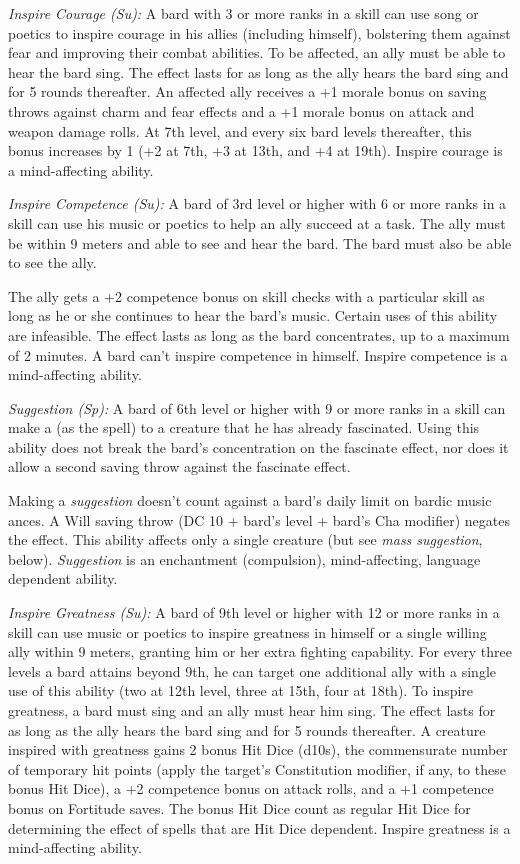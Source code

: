 \textit{Inspire Courage (Su):} A bard with 3 or more ranks in a  skill can use song or poetics to inspire courage in his allies (including himself), bolstering them against fear and improving their combat abilities. To be affected, an ally must be able to hear the bard sing. The effect lasts for as long as the ally hears the bard sing and for 5 rounds thereafter. An affected ally receives a +1 morale bonus on saving throws against charm and fear effects and a +1 morale bonus on attack and weapon damage rolls. At 7th level, and every six bard levels thereafter, this bonus increases by 1 (+2 at 7th, +3 at 13th, and +4 at 19th). Inspire courage is a mind-affecting ability.

\textit{Inspire Competence (Su):} A bard of 3rd level or higher with 6 or more ranks in a  skill can use his music or poetics to help an ally succeed at a task. The ally must be within 9 meters and able to see and hear the bard. The bard must also be able to see the ally.

The ally gets a +2 competence bonus on skill checks with a particular skill as long as he or she continues to hear the bard's music. Certain uses of this ability are infeasible. The effect lasts as long as the bard concentrates, up to a maximum of 2 minutes. A bard can't inspire competence in himself. Inspire competence is a mind-affecting ability.

\textit{Suggestion (Sp):} A bard of 6th level or higher with 9 or more ranks in a  skill can make a  (as the spell) to a creature that he has already fascinated. Using this ability does not break the bard's concentration on the fascinate effect, nor does it allow a second saving throw against the fascinate effect.

Making a \emph{suggestion} doesn't count against a bard's daily limit on bardic music ances. A Will saving throw (DC 10 + \onehalf bard's level + bard's Cha modifier) negates the effect. This ability affects only a single creature (but see \emph{mass suggestion}, below). \emph{Suggestion} is an enchantment (compulsion), mind-affecting, language dependent ability.

\textit{Inspire Greatness (Su):} A bard of 9th level or higher with 12 or more ranks in a  skill can use music or poetics to inspire greatness in himself or a single willing ally within 9 meters, granting him or her extra fighting capability. For every three levels a bard attains beyond 9th, he can target one additional ally with a single use of this ability (two at 12th level, three at 15th, four at 18th). To inspire greatness, a bard must sing and an ally must hear him sing. The effect lasts for as long as the ally hears the bard sing and for 5 rounds thereafter. A creature inspired with greatness gains 2 bonus Hit Dice (d10s), the commensurate number of temporary hit points (apply the target's Constitution modifier, if any, to these bonus Hit Dice), a +2 competence bonus on attack rolls, and a +1 competence bonus on Fortitude saves. The bonus Hit Dice count as regular Hit Dice for determining the effect of spells that are Hit Dice dependent. Inspire greatness is a mind-affecting ability.

